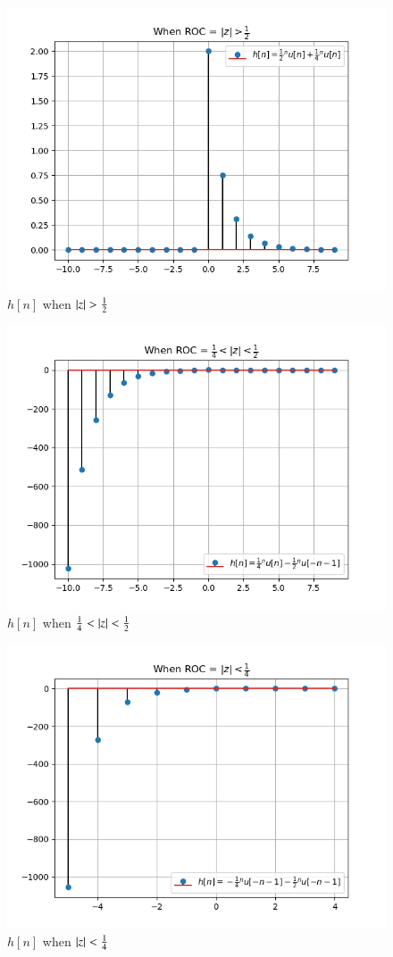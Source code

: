 \documentclass[journal,12pt,twocolumn]{IEEEtran}
\begin{document}
 \begin{figure}[!ht]
\centering
 \includegraphics[width=\columnwidth]{Graphs/S1.png}
 \caption{$h[n]$ when $\left\vert z\right\vert > \frac{1}{2}$}
 \end{figure}
  \begin{figure}[!ht]
\centering
 \includegraphics[width=\columnwidth]{Graphs/S3.png}
 \caption{$h[n]$ when $\frac{1}{4}<\left\vert z\right\vert < \frac{1}{2}$}
 \end{figure}
  \begin{figure}[!ht]
\centering
 \includegraphics[width=\columnwidth]{Graphs/S2.png}
 \caption{$h[n]$ when $\left\vert z\right\vert < \frac{1}{4}$}
 \end{figure}
 
 
\end{document}
